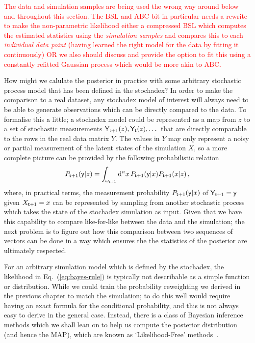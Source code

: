\textcolor{red}{The data and simulation samples are being used the wrong way around below and throughout this section. The BSL and ABC bit in particular needs a rewrite to make the non-parametric likelihood either a compressed BSL which computes the estimated statistics using the \emph{simulation samples} and compares this to each \emph{individual data point} (having learned the right model for the data by fitting it continuously) OR we also should discuss and provide the option to fit this using a constantly refitted Gaussian process which would be more akin to ABC. }

How might we calulate the posterior in practice with some arbitrary stochastic process model that has been defined in the stochadex? In order to make the comparison to a real dataset, any stochadex model of interest will always need to be able to generate observations which can be directly compared to the data. To formalise this a little; a stochadex model could be represented as a map from $z$ to a set of stochastic measurements ${\sf Y}_{{\sf t}+1}(z), {\sf Y}_{{\sf t}}(z), \dots$ that are directly comparable to the rows in the real data matrix $Y$. The values in $Y$ may only represent a noisy or partial measurement of the latent states of the simulation $X$, so a more complete picture can be provided by the following probabilistic relation
\begin{align}
P_{{\sf t}+1}({\sf y} \vert z) = \int_{\omega_{{\sf t}+1}}{\rm d}^nx\, P_{{\sf t}+1}({\sf y} \vert x)P_{{\sf t}+1}(x \vert z) \,, \label{eq:simulation-measurement}
\end{align}
where, in practical terms, the measurement probability $P_{{\sf t}+1}({\sf y} \vert x)$ of ${\sf Y}_{{\sf t}+1}={\sf y}$ given $X_{{\sf t}+1}=x$ can be represented by sampling from another stochastic process which takes the state of the stochadex simulation as input. Given that we have this capability to compare like-for-like between the data and the simulation; the next problem is to figure out how this comparison between two sequences of vectors can be done in a way which ensures the the statistics of the posterior are ultimately respected. 

For an arbitrary simulation model which is defined by the stochadex, the likelihood in Eq.~(\ref{eq:bayes-rule}) is typically not describable as a simple function or distribution. While we could train the probability reweighting we derived in the previous chapter to match the simulation; to do this well would require having an exact formula for the conditional probability, and this is not always easy to derive in the general case. Instead, there is a class of Bayesian inference methods which we shall lean on to help us compute the posterior distribution (and hence the MAP), which are known as `Likelihood-Free' methods~\cite{sisson2018handbook,price2018bayesian,wood2010statistical,drovandi2022comparison}.

